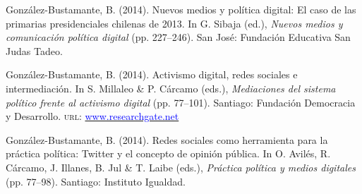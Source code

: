 \begin{publications}
\begin{benumerate}{12}
\item{González-Bustamante, B. (2014). Nuevos medios y política digital: El caso de las primarias presidenciales chilenas de 2013. In G. Sibaja (ed.), {\itshape Nuevos  medios y comunicación política digital} (pp. 227--246). San José: Fundación Educativa San Judas Tadeo.}\vspace{1mm}


\item{González-Bustamante, B. (2014). Activismo digital, redes sociales e intermediación. In S. Millaleo \& P. C\'arcamo (eds.), {\itshape Mediaciones del  sistema político frente al activismo digital} (pp. 77--101). Santiago: Fundación Democracia y Desarrollo. {\scshape url:} \href{https://www.researchgate.net/publication/321992867_Activismo_digital_redes_sociales_e_intermediacion}{\textcolor{blue}{www.researchgate.net}}}\vspace{1mm}


\item{González-Bustamante, B. (2014). Redes sociales como herramienta para la práctica política: Twitter y el concepto de opinión pública. In O. Avilés, R. Cárcamo, J. Illanes, B. Jul \& T. Laibe (eds.), {\itshape Práctica política y medios digitales} (pp. 77--98). Santiago: Instituto Igualdad.}\vspace{1mm}



\end{benumerate}
\end{publications}
